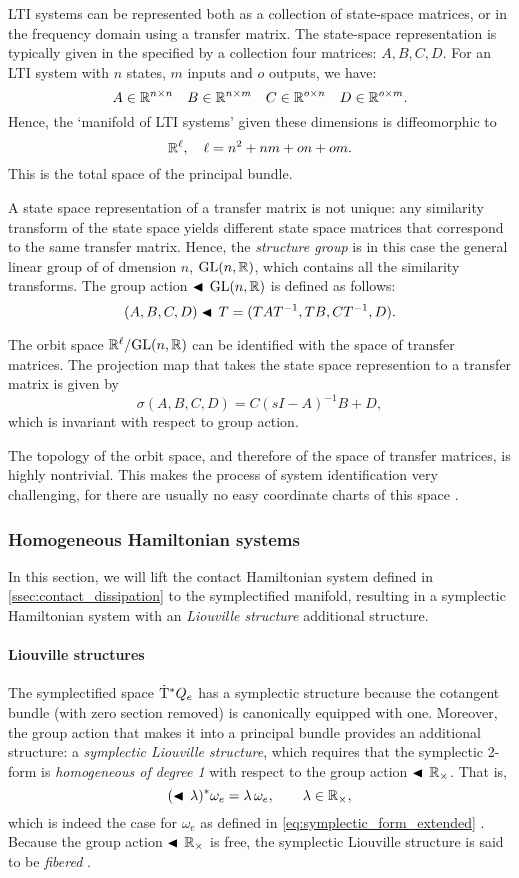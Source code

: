 LTI systems can be represented both as a collection of state-space matrices, or in the frequency domain using a transfer matrix. The state-space representation is typically given in the specified by a collection four matrices: $A, B, C, D$. For an LTI system with $n$ states, $m$ inputs and $o$ outputs, we have:
$$ A \in \mathbb{R}^{n \times n} \quad B \in \mathbb{R}^{n \times m} \quad C \in \mathbb{R}^{o \times n} \quad D \in \mathbb{R}^{o \times m}. $$
Hence, the `manifold of LTI systems' given these dimensions is diffeomorphic to \cite{Verhaegen2007} $$\mathbb{R}^{\ell}, \quad \ell = n^2 + nm + on + om.$$  
This is the total space of the principal bundle.

A state space representation of a transfer matrix is not unique: any similarity transform of the state space yields different state space matrices that correspond to the same transfer matrix. Hence, the \emph{structure group} is in this case the general linear group of of dmension $n$, $\mathrm{GL}(n, \mathbb{R})$, which contains all the similarity transforms. The group action $\blacktriangleleft\,\mathrm{GL}(n, \mathbb{R}) $ is defined as follows:
$$  (A, B, C, D) \blacktriangleleft\,T = (T A T^{-1}, TB, CT^{-1}, D). $$

The orbit space $\mathbb{R}^\ell/\mathrm{GL}(n, \mathbb{R})$ can be identified with the space of transfer matrices. The projection map that takes the state space represention to a transfer matrix is given by
$$ \sigma(A, B, C, D) = C(s I - A )^{-1} B + D, $$
which is invariant with respect to group action.

The topology of the orbit space, and therefore of the space of transfer matrices, is highly nontrivial. This makes the process of system identification very challenging, for there are usually no easy coordinate charts of this space \cite{Verhaegen2007,Hermann1984}.

\subsubsection{Homogeneous Hamiltonian systems}
In this section, we will lift the contact Hamiltonian system defined in \cref{ssec:contact_dissipation} to the symplectified manifold, resulting in a symplectic Hamiltonian system with an \emph{Liouville structure} additional structure.

\paragraph{Liouville structures} The symplectified space $\mathrm{\dot{T}}^*Q_e$ has a symplectic structure because the cotangent bundle (with zero section removed) is canonically equipped with one. Moreover, the group action that makes it into a principal bundle provides an additional structure: a \emph{symplectic Liouville structure}, which requires that the symplectic 2-form is \emph{homogeneous of degree 1} with respect to the group action $\blacktriangleleft\,\mathbb{R}_{\times}$. That is,
$$ (\blacktriangleleft\,\lambda)^* \omega_e = \lambda\,\omega_e, \qquad \lambda \in \mathbb{R}_{\times}, $$
which is indeed the case for $\omega_e$ as defined in \cref{eq:symplectic_form_extended} \cite{Libermann1987}. Because the group action $\blacktriangleleft\,\mathbb{R}_{\times}$ is free, the symplectic Liouville structure is said to be \emph{fibered} \cite{Libermann1987}.

